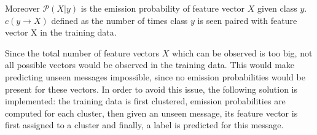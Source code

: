 Moreover $\mathcal{P}(X | y)$ is the emission probability of feature vector $X$ given class $y$.
$c(y \rightarrow X)$ defined as the number of times class $y$ is seen paired with feature vector X in the training data.

\noindent Since the total number of feature vectors $X$ which can be observed is too big, not all possible vectors would be observed in the training data. This would make predicting unseen messages impossible, since no emission probabilities would be present for these vectors. In order to avoid this issue, the following solution is implemented: the training data is first clustered, emission probabilities are computed for each cluster, then given an unseen message, its feature vector is first assigned to a cluster and finally, a label is predicted for this message. 
